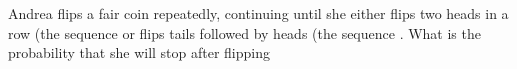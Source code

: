 Andrea flips a fair coin repeatedly, continuing until she either flips two heads in a row (the sequence  or flips tails followed by heads (the sequence . What is the probability that she will stop after flipping 